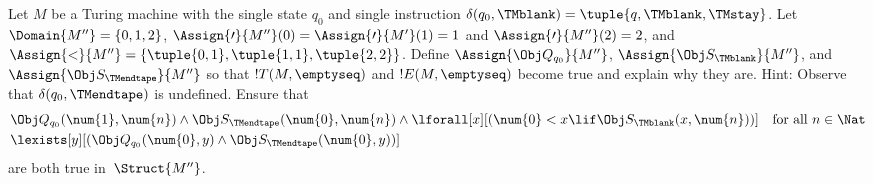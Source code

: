 \documentclass[../../../include/open-logic-section]{subfiles}
\begin{document}
\begin{explain}
  \begin{prob}
    Let $M$ be a Turing machine with the single state $q_0$ and single
    instruction $\delta(q_0,\TMblank) = \tuple{q,\TMblank,\TMstay}$.
    Let $\Domain{M''} = \{0, 1, 2\}$, $\Assign{\prime}{M''}(0) =
    \Assign{\prime}{M'}(1) = 1$ and $\Assign{\prime}{M''}(2) = 2$, and
    $\Assign{<}{M''} = \{\tuple{0,1}, \tuple{1,1}, \tuple{2,2}\}$.
    Define $\Assign{\Obj Q_{q_0}}{M''}$, $\Assign{\Obj
    S_{\TMblank}}{M''}$, and $\Assign{\Obj S_{\TMendtape}}{M''}$ so
    that $!T(M,\emptyseq)$ and $!E(M,\emptyseq)$ become true and
    explain why they are. Hint: Observe that $\delta(q_0, \TMendtape)$
    is undefined. Ensure that
    \begin{align*}
    & \Obj Q_{q_0}(\num{1}, \num{n}) \land \Obj S_{\TMendtape}(\num{0}, \num{n})
      \land 
      \lforall[x][(\num{0} < x \lif \Obj S_\TMblank(x, \num{n}))] \text{\quad for all $n \in \Nat$}\\
    & \lexists[y][(\Obj Q_{q_0}(\num{0}, y) \land \Obj S_{\TMendtape}(\num{0}, y))]
    \end{align*}
    are both true in~$\Struct{M''}$.
  \end{prob}
\end{explain}
\end{document}
